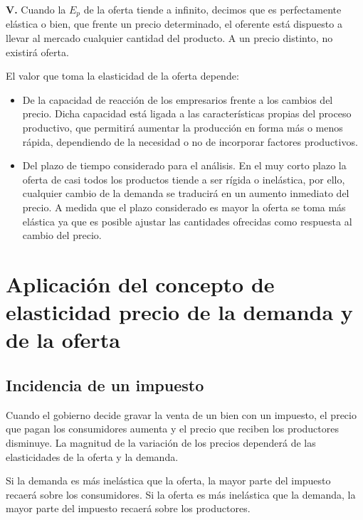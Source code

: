 \documentclass[12pt,a4paper]{article}
\begin{document}
\textbf{V.} Cuando la $E_p$ de la oferta tiende a infinito, decimos que es perfectamente elástica o bien, que frente un precio determinado, el oferente está dispuesto a llevar al mercado cualquier cantidad del producto. A un precio distinto, no existirá oferta.

El valor que toma la elasticidad de la oferta depende:

\begin{itemize}
\item De la capacidad de reacción de los empresarios frente a los cambios del precio. Dicha capacidad está ligada a las características propias del proceso productivo, que permitirá aumentar la producción en forma más o menos rápida, dependiendo de la necesidad o no de incorporar factores productivos.

\item Del plazo de tiempo considerado para el análisis. En el muy corto plazo la oferta de casi todos los productos tiende a ser rígida o inelástica, por ello, cualquier cambio de la demanda se traducirá en un aumento inmediato del precio. A medida que el plazo considerado es mayor la oferta se toma más elástica ya que es posible ajustar las cantidades ofrecidas como respuesta al cambio del precio.
\end{itemize}

\section{Aplicación del concepto de elasticidad precio de la demanda y de la oferta}

\subsection{Incidencia de un impuesto}

Cuando el gobierno decide gravar la venta de un bien con un impuesto, el precio que pagan los consumidores aumenta y el precio que reciben los productores disminuye. La magnitud de la variación de los precios dependerá de las elasticidades de la oferta y la demanda.

Si la demanda es más inelástica que la oferta, la mayor parte del impuesto recaerá sobre los consumidores. Si la oferta es más inelástica que la demanda, la mayor parte del impuesto recaerá sobre los productores.
\end{document}
